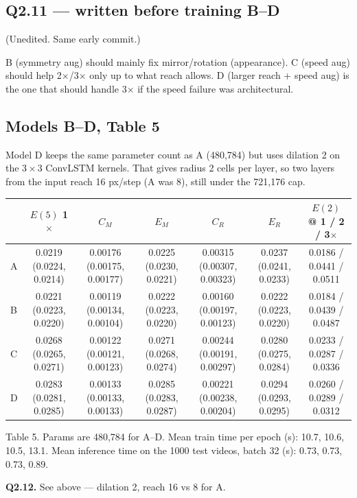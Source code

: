 \documentclass[11pt,a4paper]{article}
\begin{document}
\subsection*{Q2.11 --- written before training B--D}

(Unedited. Same early commit.)

B (symmetry aug) should mainly fix mirror/rotation (appearance). C (speed aug) should help 2$\times$/3$\times$ only up to what reach allows. D (larger reach + speed aug) is the one that should handle 3$\times$ if the speed failure was architectural.

\subsection*{Models B--D, Table 5}

Model D keeps the same parameter count as A (480{,}784) but uses dilation 2 on the $3\times 3$ ConvLSTM kernels. That gives radius 2 cells per layer, so two layers from the input reach 16 px/step (A was 8), still under the 721{,}176 cap.

\begin{center}
\scriptsize
\begin{tabular}{lcccccc}
\toprule
 & $E(5)$ 1$\times$ & $C_M$ & $E_M$ & $C_R$ & $E_R$ & $E(2)$ @ 1 / 2 / 3$\times$ \\
\midrule
A & 0.0219 (0.0224, 0.0214) & 0.00176 (0.00175, 0.00177) & 0.0225 (0.0230, 0.0221) & 0.00315 (0.00307, 0.00323) & 0.0237 (0.0241, 0.0233) & 0.0186 / 0.0441 / 0.0511 \\
B & 0.0221 (0.0223, 0.0220) & 0.00119 (0.00134, 0.00104) & 0.0222 (0.0223, 0.0220) & 0.00160 (0.00197, 0.00123) & 0.0222 (0.0223, 0.0220) & 0.0184 / 0.0439 / 0.0487 \\
C & 0.0268 (0.0265, 0.0271) & 0.00122 (0.00121, 0.00123) & 0.0271 (0.0268, 0.0274) & 0.00244 (0.00191, 0.00297) & 0.0280 (0.0275, 0.0284) & 0.0233 / 0.0287 / 0.0336 \\
D & 0.0283 (0.0281, 0.0285) & 0.00133 (0.00133, 0.00133) & 0.0285 (0.0283, 0.0287) & 0.00221 (0.00238, 0.00204) & 0.0294 (0.0293, 0.0295) & 0.0260 / 0.0289 / 0.0312 \\
\bottomrule
\end{tabular}
\end{center}
\noindent
Table 5. Params are 480{,}784 for A--D. Mean train time per epoch (s): 10.7, 10.6, 10.5, 13.1. Mean inference time on the 1000 test videos, batch 32 (s): 0.73, 0.73, 0.73, 0.89.

\textbf{Q2.12.} See above --- dilation 2, reach 16 vs 8 for A.
\end{document}
